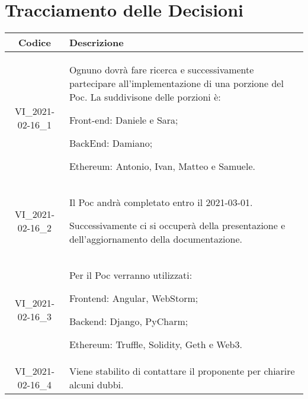 \section*{Tracciamento delle Decisioni}

\begin{center}
	\begin{longtable}{|c|p{13cm}|}
	\hline
	\rowcolor{lighter-grayer}
	\textbf{Codice} & \textbf{Descrizione} \\
	\hline
	\endfirsthead

	\hline
	VI\_2021-02-16\_1 & Ognuno dovrà fare ricerca e successivamente partecipare all'implementazione di una porzione del Poc.
	La suddivisone delle porzioni è:
	
	Front-end:
	Daniele e Sara;
	
	BackEnd:
	Damiano;
	
	Ethereum:
	Antonio, Ivan, Matteo e Samuele. \\
	\hline
	VI\_2021-02-16\_2 & Il Poc andrà completato entro il 2021-03-01.
	
	Successivamente ci si occuperà della presentazione e dell'aggiornamento della documentazione. \\
	\hline
	VI\_2021-02-16\_3 & Per il Poc verranno utilizzati:
	
	Frontend:
	Angular,
	WebStorm;
	
	Backend:
	Django,
	PyCharm;
	
	Ethereum:
	Truffle, Solidity, Geth e Web3. \\
	\hline
	VI\_2021-02-16\_4 & Viene stabilito di contattare il proponente per chiarire alcuni dubbi. \\
	\hline

	

	\end{longtable}
\end{center}